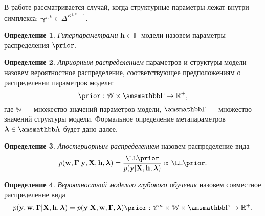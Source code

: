 \documentclass[11pt, a5paper]{dissert}
\theoremstyle{definition}
\newtheorem{defin}{Определение}
\begin{document}
В работе рассматривается случай, когда структурные параметры лежат внутри симплекса: $\boldsymbol{\gamma}^{j,k} \in {\Delta}^{K^{j,k}-1}$.%


\begin{defin}
\textit{Гиперпараметрами} $\mathbf{h}\in \mathbb{H}$ модели  назовем параметры распределения $\prior$.
\end{defin}

\begin{defin}
\textit{Априорным распределением} параметров и структуры модели назовем вероятностное распределение, соответствующее предположениям о распределении параметров модели:
\[
    \prior: \mathbb{W} \times \Gb \to \mathbb{R}^{+}, 
\]
где $\mathbb{W}$ --- множество значений параметров модели, $\Gb$ --- множество значений структуры модели.%
Формальное определение метапараметров $\lam \in \Lamb$ будет дано далее.
\end{defin}



\begin{defin}
\textit{Апостериорным распределением} назовем распределение вида
\begin{equation}
\label{eq:posterior}
    \post = \frac{\LL \prior}{\EV} \propto \LL \prior.%
\end{equation}
\end{defin}

\begin{defin}
\textit{Вероятностной моделью глубокого обучения} назовем совместное распределение вида
\[
    p(\y, \mathbf{w},  \boldsymbol{\Gamma}|\X, \mathbf{h}, \lam) = p(\y|\X, \mathbf{w},  \boldsymbol{\Gamma}, \lam)\prior: {\yb}^m \times \mathbb{W}  \times \Gb  \to \mathbb{R}^{+}.
\]
\end{defin}
\end{document}
